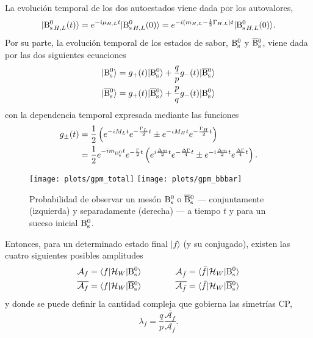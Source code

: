La evolución temporal de los dos autoestados viene dada por los autovalores,
\[|{\text{B}{}_{\text{s}}^{\text{0}}}_{H,L} (t) \rangle  = e^{-i \mu_{H,L}t } |{\text{B}{}_{\text{s}}^{\text{0}}}_{H,L} (0)\rangle = e^{-i (m_{H,L} - \frac{1}{2} \Gamma_{H,L})t} |{\text{B}{}_{\text{s}}^{\text{0}}}_{H,L} (0)\rangle. \]
Por su parte, la evolución temporal de los estados de sabor, $\text{B}{}_{\text{s}}^{\text{0}}$ y $\overline{\text{B}}{}_{\text{s}}^{\text{0}}$, viene dada por las dos siguientes ecuaciones
\begin{equation}
\begin{split}
|\text{B}{}_{\text{s}}^{\text{0}}\rangle  = g_+(t) |\text{B}{}_{\text{s}}^{\text{0}}\rangle  + \frac{q}{p} g_-(t) |\overline{\text{B}}{}_{\text{s}}^{\text{0}}\rangle\\
|\overline{\text{B}}{}_{\text{s}}^{\text{0}}\rangle = g_+(t) |\overline{\text{B}}{}_{\text{s}}^{\text{0}}\rangle + \frac{p}{q} g_-(t) |\text{B}{}_{\text{s}}^{\text{0}} \rangle
\end{split}	
\end{equation}
%
con la dependencia temporal expresada mediante las funciones
\begin{equation}
\begin{split}
g_{\pm}(t) &=  \frac{1}{2} \left( e^{-iM_Lt} e^{-\frac{\Gamma_L}{2} t} \pm e^{-iM_Ht} e^{-\frac{\Gamma_H}{2} t} \right) \\
& = \frac{1}{2} e^{-im_{\text{B}{}_{\text{s}}^{\text{0}}}t} e^{-\frac{\Gamma}{2}t} \left( e^{i\frac{\Delta m}{2}t} e^{-\frac{\Delta \Gamma}{4}t}  \pm e^{-i\frac{\Delta m}{2}t} e^{\frac{\Delta \Gamma}{4}t} \right).	
\end{split} \label{eq_gedete}
\end{equation}
%
%
%
%
%

\begin{figure}[H]
\centering
\texttt{[image: plots/gpm\_total]}	 \hfill
\texttt{[image: plots/gpm\_bbbar]}	 \hfill
\caption{Probabilidad de observar un mesón $\text{B}{}_{\text{s}}^{\text{0}} \text{ o } \overline{\text{B}}{}_{\text{s}}^{\text{0}}$ --- conjuntamente  (izquierda) y separadamente (derecha) --- a tiempo $t$ \color{vero} y para un suceso inicial $\text{B}{}_{\text{s}}^{\text{0}}$. \color{norm} }
\end{figure}

Entonces, para un determinado estado final $|f\rangle$ (y su conjugado), existen las cuatro siguientes posibles amplitudes
\begin{equation}
\begin{split}
\mathcal{A}_f = \langle f | \mathcal{H}_{W} | \text{B}{}_{\text{s}}^{\text{0}} \rangle \qquad \qquad\mathcal{A}_{\bar f} = \langle \bar f | \mathcal{H}_{W} | \text{B}{}_{\text{s}}^{\text{0}} \rangle \\
\overline{\mathcal{A}_f} = \langle f | \mathcal{H}_{W} | \overline{\text{B}}{}_{\text{s}}^{\text{0}} \rangle \qquad \qquad \overline{\mathcal{A}_{\bar f}} = \langle \bar f | \mathcal{H}_{W} | \overline{\text{B}}{}_{\text{s}}^{\text{0}} \rangle
\end{split}
\end{equation}
%
\color{vero} y donde se puede definir la cantidad compleja que gobierna las simetrías CP, 
%
\begin{equation}
\lambda_f = \frac{q}{p} \frac{\overline{\mathcal{A}_f}}{\mathcal{A}_f}.
\end{equation}
\color{norm}






